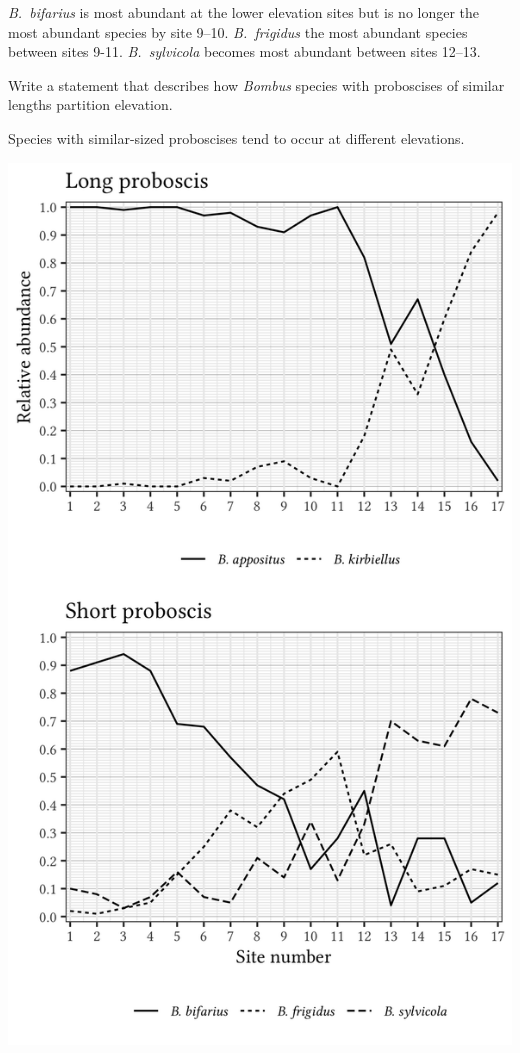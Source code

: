 \documentclass[12pt, hidelinks]{exam}
\newcommand*\AnswerBox[2]{%
    \parbox[t][#1]{0.92\textwidth}{%
    \begin{solution}#2\end{solution}}
    \vspace{\stretch{1}}
}
\begin{document}
\begin{questions}
\AnswerBox{0.05\textheight}{\textit{B.~bifarius} is most abundant
at the lower elevation sites but is no longer the most abundant 
species by site 9–10. \textit{B.~frigidus} the most abundant species
between sites 9-11. \textit{B.~sylvicola} becomes most abundant 
between sites 12–13.}

\question
Write a statement that describes how \textit{Bombus} species with
proboscises of similar lengths partition elevation.

\AnswerBox{0.02\textheight}{Species with similar-sized proboscises
tend to occur at different elevations.}

\newpage

\label{fig:relative_abundance}
\ifprintanswers
	\includegraphics[height=\textheight]{gothic_relative_abundance_key}

\end{questions}
\end{document}
